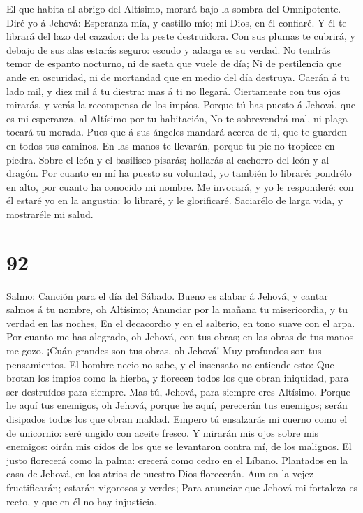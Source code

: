  El que habita al abrigo del Altísimo, morará bajo la
sombra del Omnipotente.  Diré yo á Jehová: Esperanza mía,
y castillo mío; mi Dios, en él confiaré.  Y él te librará
del lazo del cazador: de la peste destruidora.  Con sus
plumas te cubrirá, y debajo de sus alas estarás seguro: escudo y adarga
es su verdad.  No tendrás temor de espanto nocturno, ni de
saeta que vuele de día;  Ni de pestilencia que ande en
oscuridad, ni de mortandad que en medio del día destruya. 
Caerán á tu lado mil, y diez mil á tu diestra: mas á ti no llegará.
 Ciertamente con tus ojos mirarás, y verás la recompensa
de los impíos.  Porque tú has puesto á Jehová, que es mi
esperanza, al Altísimo por tu habitación,  No te
sobrevendrá mal, ni plaga tocará tu morada.  Pues que á
sus ángeles mandará acerca de ti, que te guarden en todos tus caminos.
 En las manos te llevarán, porque tu pie no tropiece en
piedra.  Sobre el león y el basilisco pisarás; hollarás
al cachorro del león y al dragón.  Por cuanto en mí ha
puesto su voluntad, yo también lo libraré: pondrélo en alto, por cuanto
ha conocido mi nombre.  Me invocará, y yo le responderé:
con él estaré yo en la angustia: lo libraré, y le glorificaré.
 Saciarélo de larga vida, y mostraréle mi salud.

\hypertarget{section-91}{%
\section{92}\label{section-91}}

 Salmo: Canción para el día del Sábado. Bueno es alabar á
Jehová, y cantar salmos á tu nombre, oh Altísimo; 
Anunciar por la mañana tu misericordia, y tu verdad en las noches,
 En el decacordio y en el salterio, en tono suave con el
arpa.  Por cuanto me has alegrado, oh Jehová, con tus
obras; en las obras de tus manos me gozo.  ¡Cuán grandes
son tus obras, oh Jehová! Muy profundos son tus pensamientos.
 El hombre necio no sabe, y el insensato no entiende esto:
 Que brotan los impíos como la hierba, y florecen todos
los que obran iniquidad, para ser destruídos para siempre.
 Mas tú, Jehová, para siempre eres Altísimo.
 Porque he aquí tus enemigos, oh Jehová, porque he aquí,
perecerán tus enemigos; serán disipados todos los que obran maldad.
 Empero tú ensalzarás mi cuerno como el de unicornio:
seré ungido con aceite fresco.  Y mirarán mis ojos sobre
mis enemigos: oirán mis oídos de los que se levantaron contra mí, de los
malignos.  El justo florecerá como la palma: crecerá como
cedro en el Líbano.  Plantados en la casa de Jehová, en
los atrios de nuestro Dios florecerán.  Aun en la vejez
fructificarán; estarán vigorosos y verdes;  Para anunciar
que Jehová mi fortaleza es recto, y que en él no hay injusticia.

